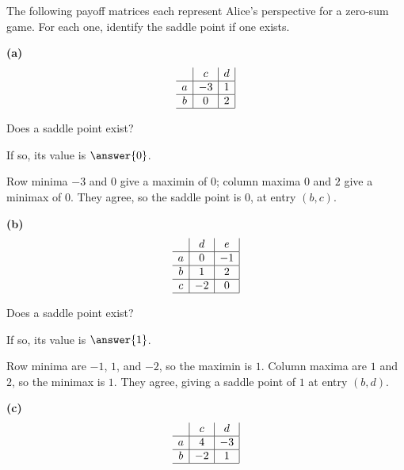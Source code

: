 \documentclass[12pt]{ximera}
\begin{document}
\begin{problem}
The following payoff matrices each represent Alice's perspective for a zero-sum game.
For each one, identify the saddle point if one exists.

\begin{prompt}
\textbf{(a)}
\[
\begin{array}{c|c|c|}
\phantom{|} & c & d \\\hline
a & -3 & 1 \\\hline
b & 0 & 2 \\\hline
\end{array}
\]

Does a saddle point exist?
\begin{multipleChoice}
\end{multipleChoice}

If so, its value is $\answer{0}$.

\begin{feedback}
Row minima $-3$ and $0$ give a maximin of $0$; column maxima $0$ and $2$ give a
minimax of $0$. They agree, so the saddle point is $0$, at entry $(b,c)$.
\end{feedback}
\end{prompt}

\begin{prompt}
\textbf{(b)}
\[
\begin{array}{c|c|c|}
\phantom{|} & d & e \\\hline
a & 0 & -1 \\\hline
b & 1 & 2 \\\hline
c & -2 & 0 \\\hline
\end{array}
\]

Does a saddle point exist?
\begin{multipleChoice}
\end{multipleChoice}

If so, its value is $\answer{1}$.

\begin{feedback}
Row minima are $-1$, $1$, and $-2$, so the maximin is $1$. Column maxima are $1$ and
$2$, so the minimax is $1$. They agree, giving a saddle point of $1$ at entry
$(b,d)$.
\end{feedback}
\end{prompt}

\begin{prompt}
\textbf{(c)}
\[
\begin{array}{c|c|c|}
\phantom{|} & c & d \\\hline
a & 4 & -3 \\\hline
b & -2 & 1 \\\hline
\end{array}
\]


\end{prompt}
\end{problem}
\end{document}
